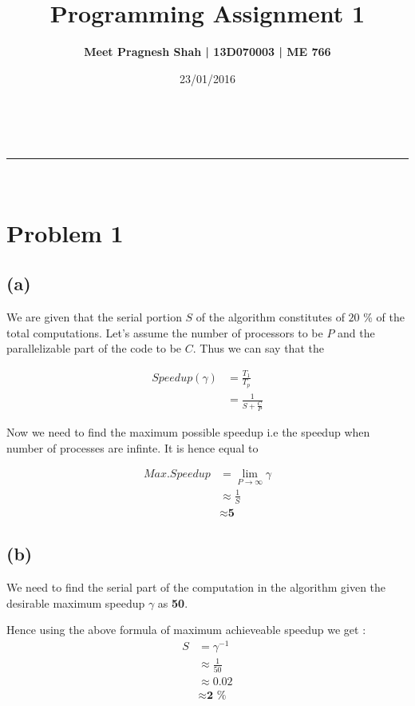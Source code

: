 \documentclass[a4paper,11pt]{article}
\makeatletter
\newcommand{\linia}{\rule{\linewidth}{0.5pt}}
\theoremstyle{mytheor}
\renewcommand{\maketitle}{
\begin{center}
\vspace{2ex}
{\huge \textsc{\@title}}
\vspace{1ex}
\\
\linia\\
\@author \hfill \@date
\vspace{4ex}
\end{center}
}
\makeatother
\begin{document}
\title{Programming Assignment \textnumero{} 1}

\author{\textbf{Meet Pragnesh Shah | 13D070003 | ME 766}}

\date{23/01/2016}

\maketitle

\section{Problem 1}

\subsection{(a)}

We are given that the serial portion $S$ of the algorithm constitutes of $20$ \% of the total computations. Let's assume the number of processors to be $P$ and the parallelizable part of the code to be $C$. Thus we can say that the 

\begin{align*}
Speedup ( \gamma )   &= \frac{T_1}{T_p} \\
&= \frac{1}{S + \frac{C}{P}}
\end{align*}

Now we need to find the maximum possible speedup i.e the speedup when number of processes are infinte. It is hence equal to 

\begin{align*}
Max. Speedup &= \lim_{P\to\infty} \gamma \\
&\approx \frac{1}{S} \\
&\approx \textbf{5}
\end{align*}

\subsection{(b)}

We need to find the serial part of the computation in the algorithm given the desirable maximum speedup $\gamma$ as \textbf{50}.

Hence using the above formula of maximum achieveable speedup we get : \begin{align*}
S &=  \gamma^{-1} \\
&\approx \frac{1}{50} \\
&\approx 0.02 \\
&\approx \textbf{2 \%}
\end{align*}
	
\end{document}
